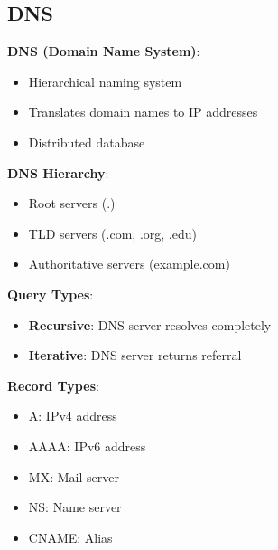 \documentclass[12pt,a4paper]{report}
\begin{document}
\subsection{DNS}
\begin{concept}
\textbf{DNS (Domain Name System)}:
\begin{itemize}
    \item Hierarchical naming system
    \item Translates domain names to IP addresses
    \item Distributed database
\end{itemize}

\textbf{DNS Hierarchy}:
\begin{itemize}
    \item Root servers (.)
    \item TLD servers (.com, .org, .edu)
    \item Authoritative servers (example.com)
\end{itemize}

\textbf{Query Types}:
\begin{itemize}
    \item \textbf{Recursive}: DNS server resolves completely
    \item \textbf{Iterative}: DNS server returns referral
\end{itemize}

\textbf{Record Types}:
\begin{itemize}
    \item A: IPv4 address
    \item AAAA: IPv6 address
    \item MX: Mail server
    \item NS: Name server
    \item CNAME: Alias
\end{itemize}
\end{concept}
\end{document}
